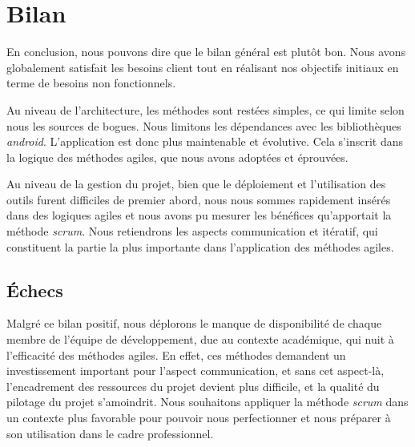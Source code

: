 \section{Bilan}

En conclusion, nous pouvons dire que le bilan général est plutôt bon. Nous avons globalement satisfait les besoins client tout en réalisant nos objectifs initiaux en terme de besoins non fonctionnels.

Au niveau de l'architecture, les méthodes sont restées simples, ce qui limite selon nous les sources de bogues. Nous limitons les dépendances avec les bibliothèques \emph{android}. L'application est donc plus maintenable et évolutive.
Cela s'inscrit dans la logique des méthodes agiles, que nous avons adoptées et éprouvées. 

Au niveau de la gestion du projet, bien que le déploiement et l'utilisation des outils furent difficiles de premier abord, nous nous sommes rapidement insérés dans des logiques agiles et nous avons pu mesurer les bénéfices qu'apportait la méthode \emph{scrum}. Nous retiendrons les aspects communication et itératif, qui constituent la partie la plus importante dans l'application des méthodes agiles.

\subsection{Échecs}

Malgré ce bilan positif, nous déplorons le manque de disponibilité de chaque membre de l'équipe de développement, due au contexte académique, qui nuit à l'efficacité des méthodes agiles. En effet, ces méthodes demandent un investissement important pour l'aspect communication, et sans cet aspect-là, l'encadrement des ressources du projet devient plus difficile, et la qualité du pilotage du projet s'amoindrit. Nous souhaitons appliquer la méthode \emph{scrum} dans un contexte plus favorable pour pouvoir nous perfectionner et nous préparer à son utilisation dans le cadre professionnel.

